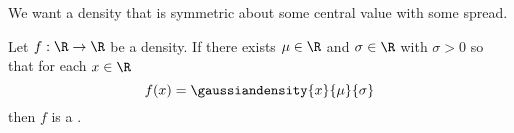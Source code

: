 

We want a density that is
symmetric about some central
value with some spread.


Let $f: \R \to \R$ be a density.
If there exists $\mu \in \R$
and $\sigma \in \R$ with $\sigma > 0$
so that for each $x \in \R$
\[
  f(x) = \gaussiandensity{x}{\mu}{\sigma}
\]
then $f$ is a .
